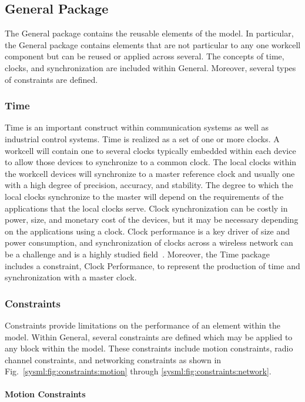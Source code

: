 \subsection{General Package}
The General package contains the reusable elements of the model.  In particular, the General package contains elements that are not particular to any one workcell component but can be reused or applied across several.  The concepts of time, clocks, and synchronization are included within General.  Moreover, several types of constraints are defined.  

\subsubsection{Time}
Time is an important construct within communication systems as well as industrial control systems.  Time is realized as a set of one or more clocks. A workcell will contain one to several clocks typically embedded within each device to allow those devices to synchronize to a common clock. The local clocks within the workcell devices will synchronize to a master reference clock and usually one with a high degree of precision, accuracy, and stability.  The degree to which the local clocks synchronize to the master will depend on the requirements of the applications that the local clocks serve.  Clock synchronization can be costly in power, size, and monetary cost of the devices, but it may be necessary depending on the applications using a clock.  Clock performance is a key driver of size and power consumption, and synchronization of clocks across a wireless network can be a challenge and is a highly studied field~\cite{ClockSync.Mahmood2017,ClockSync.Geetha2017}. Moreover, the Time package includes a constraint, Clock Performance, to represent the production of time and synchronization with a master clock. 

\subsubsection{Constraints}\label{sysml:sec:general:constraints}
Constraints provide limitations on the performance of an element within the model.  Within General, several constraints are defined which may be applied to any block within the model. These constraints include motion constraints, radio channel constraints, and networking constraints as shown in Fig.~\ref{sysml:fig:constraints:motion} through \ref{sysml:fig:constraints:network}.  

\paragraph{Motion Constraints}\label{sysml:sec:constraints:motion}

